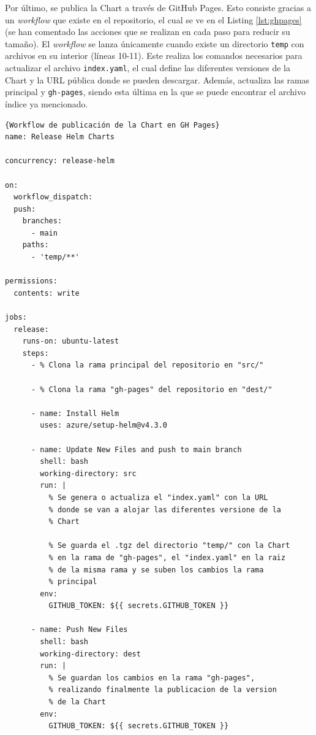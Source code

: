 Por último, se publica la Chart a través de GitHub Pages. Esto consiste gracias a un \textit{workflow} que existe en el repositorio, el cual se ve en el Listing \ref{lst:ghpages} (se han comentado las acciones que se realizan en cada paso para reducir su tamaño). El \textit{workflow} se lanza únicamente cuando existe un directorio \texttt{temp} con archivos en su interior (líneas 10-11). Este realiza los comandos necesarios para actualizar el archivo \texttt{index.yaml}, el cual define las diferentes versiones de la Chart y la URL pública donde se pueden descargar. Además, actualiza las ramas principal y \texttt{gh-pages}, siendo esta última en la que se puede encontrar el archivo índice ya mencionado.

\begin{lstlisting}[language=workflows,label=lst:ghpages]{Workflow de publicación de la Chart en GH Pages}
name: Release Helm Charts

concurrency: release-helm

on:
  workflow_dispatch:
  push:
    branches:
      - main
    paths:
      - 'temp/**'

permissions:
  contents: write

jobs:
  release:
    runs-on: ubuntu-latest
    steps:
      - % Clona la rama principal del repositorio en "src/"

      - % Clona la rama "gh-pages" del repositorio en "dest/"

      - name: Install Helm
        uses: azure/setup-helm@v4.3.0

      - name: Update New Files and push to main branch
        shell: bash
        working-directory: src
        run: |
          % Se genera o actualiza el "index.yaml" con la URL
          % donde se van a alojar las diferentes versione de la
          % Chart

          % Se guarda el .tgz del directorio "temp/" con la Chart
          % en la rama de "gh-pages", el "index.yaml" en la raiz
          % de la misma rama y se suben los cambios la rama
          % principal
        env:
          GITHUB_TOKEN: ${{ secrets.GITHUB_TOKEN }}

      - name: Push New Files
        shell: bash
        working-directory: dest
        run: |
          % Se guardan los cambios en la rama "gh-pages",
          % realizando finalmente la publicacion de la version
          % de la Chart
        env:
          GITHUB_TOKEN: ${{ secrets.GITHUB_TOKEN }}
\end{lstlisting}

